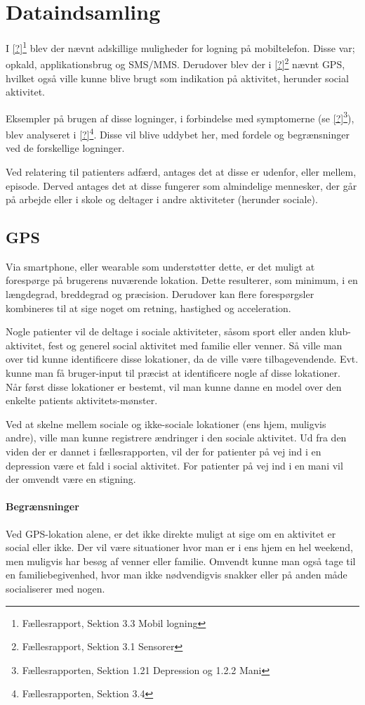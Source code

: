\section{Dataindsamling}
I \cref{?}\footnote{Fællesrapport, Sektion 3.3 Mobil logning} blev der nævnt adskillige muligheder for logning på mobiltelefon.
Disse var; opkald, applikationsbrug og SMS/MMS.
Derudover blev der i \cref{?}\footnote{Fællesrapport, Sektion 3.1 Sensorer} nævnt GPS, hvilket også ville kunne blive brugt som indikation på aktivitet, herunder social aktivitet.

Eksempler på brugen af disse logninger, i forbindelse med symptomerne (se \cref{?}\footnote{Fællesrapporten, Sektion 1.21 Depression og 1.2.2 Mani}), blev analyseret i \cref{?}\footnote{Fællesrapporten, Sektion 3.4}.
Disse vil blive uddybet her, med fordele og begrænsninger ved de forskellige logninger.

Ved relatering til patienters adfærd, antages det at disse er udenfor, eller mellem, episode.
Derved antages det at disse fungerer som almindelige mennesker, der går på arbejde eller i skole og deltager i andre aktiviteter (herunder sociale).

\subsection{GPS}
Via smartphone, eller wearable som understøtter dette, er det muligt at forespørge på brugerens nuværende lokation.
Dette resulterer, som minimum, i en længdegrad, breddegrad og præcision.
Derudover kan flere forespørgsler kombineres til at sige noget om retning, hastighed og acceleration.

Nogle patienter vil de deltage i sociale aktiviteter, såsom sport eller anden klub-aktivitet, fest og generel social aktivitet med familie eller venner.
Så ville man over tid kunne identificere disse lokationer, da de ville være tilbagevendende.
Evt. kunne man få bruger-input til præcist at identificere nogle af disse lokationer.
Når først disse lokationer er bestemt, vil man kunne danne en model over den enkelte patients aktivitets-mønster.

Ved at skelne mellem sociale og ikke-sociale lokationer (ens hjem, muligvis andre), ville man kunne registrere ændringer i den sociale aktivitet.
Ud fra den viden der er dannet i fællesrapporten, vil der for patienter på vej ind i en depression være et fald i social aktivitet.
For patienter på vej ind i en mani vil der omvendt være en stigning.

\paragraph{Begrænsninger}
Ved GPS-lokation alene, er det ikke direkte muligt at sige om en aktivitet er social eller ikke.
Der vil være situationer hvor man er i ens hjem en hel weekend, men muligvis har besøg af venner eller familie.
Omvendt kunne man også tage til en familiebegivenhed, hvor man ikke nødvendigvis snakker eller på anden måde socialiserer med nogen.

